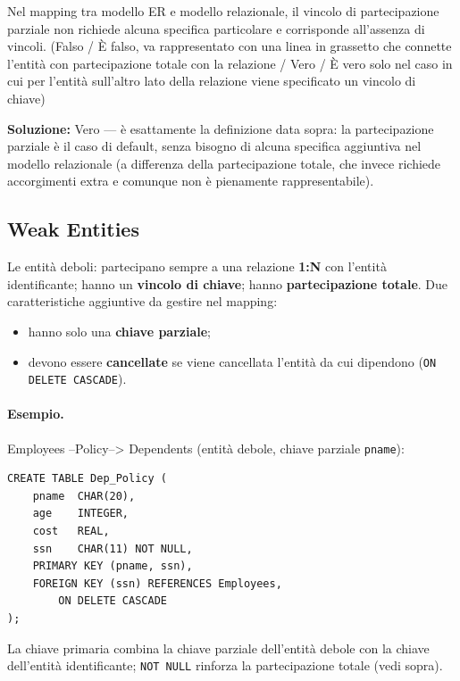 \documentclass[12pt, a4paper]{article}
\begin{document}
\begin{tcolorbox}[colback=lightergray!10, colframe=tocsec, title=\textbf{Esercizio 1}]
Nel mapping tra modello ER e modello relazionale, il vincolo di partecipazione parziale non richiede alcuna specifica particolare e corrisponde all'assenza di vincoli. (Falso / È falso, va rappresentato con una linea in grassetto che connette l'entità con partecipazione totale con la relazione / Vero / È vero solo nel caso in cui per l'entità sull'altro lato della relazione viene specificato un vincolo di chiave)
\end{tcolorbox}
\textbf{Soluzione:} Vero — è esattamente la definizione data sopra: la partecipazione parziale è il caso di default, senza bisogno di alcuna specifica aggiuntiva nel modello relazionale (a differenza della partecipazione totale, che invece richiede accorgimenti extra e comunque non è pienamente rappresentabile).

\subsection{Weak Entities}
Le entità deboli: partecipano sempre a una relazione \textbf{1:N} con l'entità identificante; hanno un \textbf{vincolo di chiave}; hanno \textbf{partecipazione totale}. Due caratteristiche aggiuntive da gestire nel mapping:
\begin{itemize}
    \item hanno solo una \textbf{chiave parziale};
    \item devono essere \textbf{cancellate} se viene cancellata l'entità da cui dipendono (\texttt{ON DELETE CASCADE}).
\end{itemize}

\paragraph{Esempio.} Employees --Policy--> Dependents (entità debole, chiave parziale \texttt{pname}):
\begin{verbatim}
CREATE TABLE Dep_Policy (
    pname  CHAR(20),
    age    INTEGER,
    cost   REAL,
    ssn    CHAR(11) NOT NULL,
    PRIMARY KEY (pname, ssn),
    FOREIGN KEY (ssn) REFERENCES Employees,
        ON DELETE CASCADE
);
\end{verbatim}
La chiave primaria combina la chiave parziale dell'entità debole con la chiave dell'entità identificante; \texttt{NOT NULL} rinforza la partecipazione totale (vedi sopra).
\end{document}
